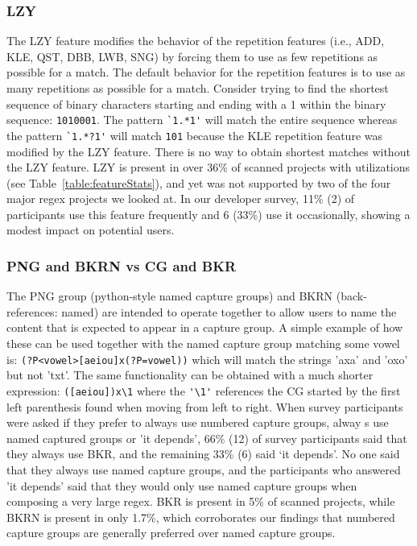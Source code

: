 \subsubsection{LZY}
The LZY feature modifies the behavior of the repetition features (i.e., ADD, KLE, QST, DBB, LWB, SNG) by forcing them to use as few repetitions as possible for a match.  The default behavior for the repetition features is to use as many repetitions as possible for a match.  Consider trying to find the shortest sequence of binary characters starting and ending with a 1 within the binary sequence: {\tt 1010001}. The pattern \verb!`1.*1'! will match the entire sequence whereas the pattern \verb!`1.*?1'! will match {\tt 101} because the KLE repetition feature was modified by the LZY feature.  There is no way to obtain shortest matches without the LZY feature.  LZY is present in over 36\% of scanned projects with utilizations (see Table~\ref{table:featureStats}), and yet was not supported by two of the four major regex projects we looked at.
In our developer survey, 11\% (2) of participants use this feature frequently and 6 (33\%) use it occasionally, showing a modest impact on potential users.

\subsubsection{PNG and BKRN vs CG and BKR}
The PNG group (python-style named capture groups) and BKRN (back-references: named) are intended to operate together to allow users to name the content that is expected to appear in a capture group.  A simple example of how these can be used together with the named capture group matching some vowel is:
\verb!(?P<vowel>[aeiou]x(?P=vowel))! which will match the strings 'axa' and 'oxo' but not 'txt'.  The same functionality can be obtained with a much shorter expression: \verb!([aeiou])x\1! where the \verb!'\1'! references the CG started by the first left parenthesis found when moving from left to right.  When survey participants were asked if they prefer to always use numbered capture groups, alway s use named captured groups or 'it depends', 66\% (12) of survey participants said that they always use BKR, and the remaining 33\% (6) said `it depends'.  No one said that they always use named capture groups, and the participants who answered 'it depends' said that they would only use named capture groups when composing a very large regex.  BKR is present in 5\% of scanned projects, while BKRN is present in only 1.7\%, which corroborates our findings that numbered capture groups are generally preferred over named capture groups.

